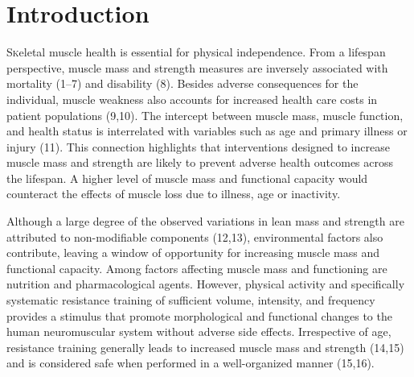 \documentclass[twoside,10pt]{gihclass} %
\begin{document}
  \hypersetup{linkcolor=black}
  \setcounter{tocdepth}{2}
  \tableofcontents

  \listoftables

  \listoffigures




\mainmatter %
\pagestyle{fancyplain} %

\setcounter{DefaultLines}{3}

\hypertarget{introduction}{%
\chapter{Introduction}\label{introduction}}

\lettrine{S}keletal muscle health is essential for physical independence. From a lifespan perspective, muscle mass and strength measures are inversely associated with mortality
(1--7)
and disability
(8).
Besides adverse consequences for the individual, muscle weakness also accounts for increased health care costs in patient populations
(9,10).
The intercept between muscle mass, muscle function, and health status is interrelated with variables such as age and primary illness or injury
(11).
This connection highlights that interventions designed to increase muscle mass and strength are likely to prevent adverse health outcomes across the lifespan. A higher level of muscle mass and functional capacity would counteract the effects of muscle loss due to illness, age or inactivity.

Although a large degree of the observed variations in lean mass and strength are attributed to non-modifiable components
(12,13),
environmental factors also contribute, leaving a window of opportunity for increasing muscle mass and functional capacity. Among factors affecting muscle mass and functioning are nutrition and pharmacological agents. However, physical activity and specifically systematic resistance training of sufficient volume, intensity, and frequency provides a stimulus that promote morphological and functional changes to the human neuromuscular system without adverse side effects. Irrespective of age, resistance training generally leads to increased muscle mass and strength
(14,15)
and is considered safe when performed in a well-organized manner
(15,16).
\end{document}
